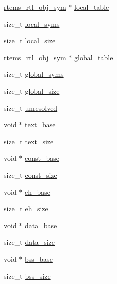 \begin{DoxyCompactItemize}
\mbox{\hyperlink{structrtems__rtl__obj__sym}{rtems\+\_\+rtl\+\_\+obj\+\_\+sym}} $\ast$ \mbox{\hyperlink{structrtems__rtl__obj_ac50c44399c53ae4ebf1e3bf86d141b8c}{local\+\_\+table}}
\item 
size\+\_\+t \mbox{\hyperlink{structrtems__rtl__obj_a33e427378e1536775de7d09aab7a3a66}{local\+\_\+syms}}
\item 
size\+\_\+t \mbox{\hyperlink{structrtems__rtl__obj_aa4d97e646b905e86bb49a78ba5733e6c}{local\+\_\+size}}
\item 
\mbox{\hyperlink{structrtems__rtl__obj__sym}{rtems\+\_\+rtl\+\_\+obj\+\_\+sym}} $\ast$ \mbox{\hyperlink{structrtems__rtl__obj_a58cbf963e8195fe58504f6e93951f7fa}{global\+\_\+table}}
\item 
size\+\_\+t \mbox{\hyperlink{structrtems__rtl__obj_ac18de699bb35faa87367a9b3c17c6154}{global\+\_\+syms}}
\item 
size\+\_\+t \mbox{\hyperlink{structrtems__rtl__obj_a7c260d224f4ee2d7592c38a3b7315e0d}{global\+\_\+size}}
\item 
size\+\_\+t \mbox{\hyperlink{structrtems__rtl__obj_a75894c4336871dcff6dac06fffd37330}{unresolved}}
\item 
void $\ast$ \mbox{\hyperlink{structrtems__rtl__obj_ab179c5ca3286552e677ef8ab3e60f8a4}{text\+\_\+base}}
\item 
size\+\_\+t \mbox{\hyperlink{structrtems__rtl__obj_a53d5c820d48902d081f639db1fce12bd}{text\+\_\+size}}
\item 
void $\ast$ \mbox{\hyperlink{structrtems__rtl__obj_ace0b9903c80f8fe5e504ec2419c18b03}{const\+\_\+base}}
\item 
size\+\_\+t \mbox{\hyperlink{structrtems__rtl__obj_a23d488bae7a4db54c784b022150d428f}{const\+\_\+size}}
\item 
void $\ast$ \mbox{\hyperlink{structrtems__rtl__obj_ac2264e0c5116ff34096b0531633dfceb}{eh\+\_\+base}}
\item 
size\+\_\+t \mbox{\hyperlink{structrtems__rtl__obj_a3a13727ccb574ea55b2e8af43bacda12}{eh\+\_\+size}}
\item 
void $\ast$ \mbox{\hyperlink{structrtems__rtl__obj_a519626110754b818f6e705199b23644f}{data\+\_\+base}}
\item 
size\+\_\+t \mbox{\hyperlink{structrtems__rtl__obj_ad85ce91cbf6910cf5da4cd7281a860cf}{data\+\_\+size}}
\item 
void $\ast$ \mbox{\hyperlink{structrtems__rtl__obj_a0290589556c14f3876535186dc9a1c19}{bss\+\_\+base}}
\item 
size\+\_\+t \mbox{\hyperlink{structrtems__rtl__obj_a4c38372bdb331ee19f8cc57b342f61af}{bss\+\_\+size}}

\end{DoxyCompactItemize}
